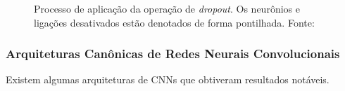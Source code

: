 \begin{figure}[h!]
  \centering
\caption{Processo de aplicação da operação de \emph{dropout}. Os neurônios e ligações desativados estão denotados de forma pontilhada. Fonte: \cite{dsacademy}}
  \hfill
  \label{fig:dropout}
\end{figure}



\subsubsection{Arquiteturas Canônicas de Redes Neurais Convolucionais}
\label{subsubsec:arq-cnns}

Existem algumas arquiteturas de CNNs que obtiveram resultados notáveis.
